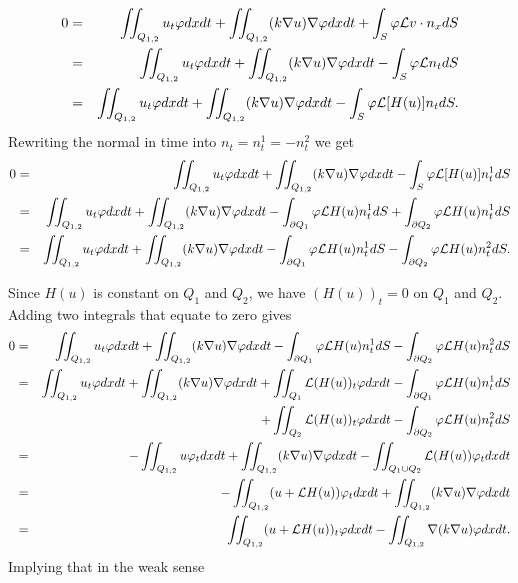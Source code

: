 \begin{eqnarray*}
0 &=& \iint_{Q_{1,2}}  u_t\varphi dx dt  + \iint_{Q_{1,2}} (k {\nabla} u) {\nabla}\varphi dx dt +  \int_{S} \varphi \mathcal{L} v \cdot n_x dS \\*
&=& \iint_{Q_{1,2}}  u_t\varphi dx dt  + \iint_{Q_{1,2}} (k {\nabla} u) {\nabla}\varphi dx dt -  \int_{S} \varphi \mathcal{L} n_t dS  \\*
&=& \iint_{Q_{1,2}}  u_t\varphi dx dt  + \iint_{Q_{1,2}} (k {\nabla} u) {\nabla}\varphi dx dt -  \int_{S} \varphi \mathcal{L} [H(u)] n_t dS.  
\end{eqnarray*}
Rewriting the normal in time into $n_t=n_t^1 = -n_t^2$ we get
\begin{eqnarray*}
0 &=& \iint_{Q_{1,2}}  u_t\varphi dx dt  + \iint_{Q_{1,2}} (k {\nabla} u) {\nabla}\varphi dx dt -  \int_{S} \varphi \mathcal{L} [H(u)] n_t^1 dS\\*
&=& \iint_{Q_{1,2}}  u_t\varphi dx dt  + \iint_{Q_{1,2}} (k {\nabla} u) {\nabla}\varphi dx dt  -  \int_{\partial Q_1} \varphi \mathcal{L} H(u) n_t^1 dS +\int_{\partial Q_2} \varphi \mathcal{L} H(u) n_t^1 dS\\*
&=& \iint_{Q_{1,2}}  u_t\varphi dx dt  + \iint_{Q_{1,2}} (k {\nabla} u) {\nabla}\varphi dx dt  -  \int_{\partial Q_1} \varphi \mathcal{L} H(u) n_t^1 dS -\int_{\partial Q_2} \varphi \mathcal{L} H(u) n_t^2 dS.\\*
\end{eqnarray*}

Since $H(u)$ is constant on $Q_1$ and $Q_2$, we have $(H(u))_t = 0$ on $Q_1$ and $Q_2$. Adding two integrals that equate to zero gives 
\begin{eqnarray*}
0  &=& \iint_{Q_{1,2}}  u_t\varphi dx dt  + \iint_{Q_{1,2}} (k \grad u) \grad\varphi dx dt  -  \int_{\partial Q_1} \varphi \mathcal{L} H(u) n_t^1 dS -\int_{\partial Q_2} \varphi \mathcal{L} H(u) n_t^2 dS\\*
 &=& \iint_{Q_{1,2}}  u_t\varphi dx dt  + \iint_{Q_{1,2}} (k \grad u) \grad\varphi dx dt  +\iint_{Q_1} \mathcal{L} (H(u))_t \varphi dx dt  -  \int_{\partial Q_1} \varphi \mathcal{L} H(u) n_t^1 dS \\* 
 & &   \hspace{6cm}  +\iint_{Q_2} \mathcal{L} (H(u))_t \varphi dx dt -\int_{\partial Q_2} \varphi \mathcal{L} H(u) n_t^2 dS\\*
 &=&- \iint_{Q_{1,2}}  u\varphi_t dx dt  + \iint_{Q_{1,2}} (k \grad u) \grad\varphi dx dt  -\iint_{Q_1\cup Q_2} \mathcal{L} (H(u)) \varphi_t dx dt \\*
 &=&- \iint_{Q_{1,2}} (u+ \mathcal{L} H(u)) \varphi_t dx dt  + \iint_{Q_{1,2}} (k \grad u) \grad\varphi dx dt  \\*
  &=& \iint_{Q_{1,2}} (u+ \mathcal{L} H(u))_t \varphi dx dt  - \iint_{Q_{1,2}} \grad(k \grad u) \varphi dx dt.  
\end{eqnarray*}
Implying that in the weak sense



